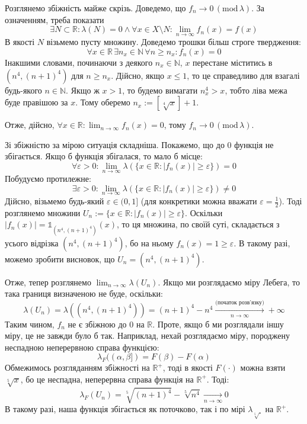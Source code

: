 \documentclass[14pt]{extarticle}
\begin{document}
Розглянемо збіжність майже скрізь. Доведемо, що $f_n \to 0 \, (\text{mod} \, \lambda)$. За означенням, треба показати
\[
\exists N \subset \mathbb{R}: \lambda(N) = 0 \wedge \forall x \in X \setminus N: \lim_{n \to \infty} f_n(x) = f(x)
\]
В якості $N$ візьмемо пусту множину. Доведемо трошки більш строге твердження:
\[
\forall x \in \mathbb{R} \, \exists n_x \in \mathbb{N} \, \forall n \geq n_x: f_n(x) = 0
\]
Інакшими словами, починаючи з деякого $n_x \in \mathbb{N}$, $x$ перестане міститись в $(n^4,(n+1)^4)$ для $n \geq n_x$. Дійсно, якщо $x \leq 1$, то це справедливо для взагалі будь-якого $n \in \mathbb{N}$. Якщо ж $x>1$, то будемо вимагати $n_x^4>x$, тобто ліва межа буде правішою за $x$. Тому оберемо $n_x := [\sqrt[4]{x}] + 1$. 

Отже, дійсно, $\forall x \in \mathbb{R}: \lim_{n \to \infty}f_n(x) = 0$, тому $f_n \to 0 \, (\text{mod} \, \lambda)$. 

Зі збіжністю за мірою ситуація складніша. Покажемо, що до $0$ функція не збігається. Якщо б функція збігалася, то мало б місце:
\[
\forall \varepsilon > 0: \lim_{n \to \infty} \lambda(\{x \in \mathbb{R}: |f_n(x)| \geq \varepsilon\}) = 0
\]
Побудуємо протилежне:
\[
\exists \varepsilon > 0: \lim_{n \to \infty}\lambda(\{x \in \mathbb{R}: |f_n(x)| \geq \varepsilon\}) \neq 0
\]
Дійсно, візьмемо будь-який $\varepsilon \in (0,1]$ (для конкретики можна вважати $\varepsilon=\frac{1}{2}$). Тоді розглянемо множини $U_n:=\{x \in \mathbb{R}: |f_n(x)| \geq \varepsilon\}$. Оскільки $|f_n(x)| = \mathds{1}_{(n^4,(n+1)^4)}(x)$, то ця множина, по своїй суті, складається з усього відрізка $(n^4,(n+1)^4)$, бо на ньому $f_n(x)=1 \geq \varepsilon$. В такому разі, можемо зробити висновок, що $U_n = (n^4,(n+1)^4)$. 

Отже, тепер розглянемо $\lim_{n \to \infty}\lambda(U_n)$. Якщо ми розглядаємо міру Лебега, то така границя визначеною не буде, оскільки:
\[
\lambda(U_n) = \lambda((n^4,(n+1)^4)) = (n+1)^4-n^4 \xrightarrow[n \to \infty]{\text{(початок розв'язку)}} +\infty
\]
Таким чином, $f_n$ не є збіжною до $0$ на $\mathbb{R}$. Проте, якщо б ми розглядали іншу міру, це не завжди було б так. Наприклад, нехай розглядаємо міру, породжену неспадною неперервною справа функцією:
\[
\lambda_F((\alpha,\beta]) = F(\beta) - F(\alpha)
\]
Обмежимось розгляданням збіжності на $\mathbb{R}^+$, тоді в якості $F(\cdot)$ можна взяти $\sqrt[5]{x}$, бо це неспадна, неперервна справа функція на $\mathbb{R}^+$. Тоді:
\[
\lambda_F(U_n) = \sqrt[5]{(n+1)^4} - \sqrt[5]{n^4} \xrightarrow[n \to \infty]{} 0
\]
В такому разі, наша функція збігається як поточково, так і по мірі $\lambda_{\sqrt[5]{\cdot}}$ на $\mathbb{R}^+$. 
\end{document}
